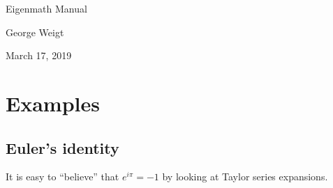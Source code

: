 \documentclass[11pt]{article}
\begin{document}
\begin{center}
{\LARGE Eigenmath Manual}

George Weigt

March 17, 2019
\end{center}

\tableofcontents

\newpage




































\section{Examples}















\subsection{Euler's identity}
It is easy to ``believe'' that $e^{i\pi}=-1$ by looking at Taylor series expansions.
\end{document}
